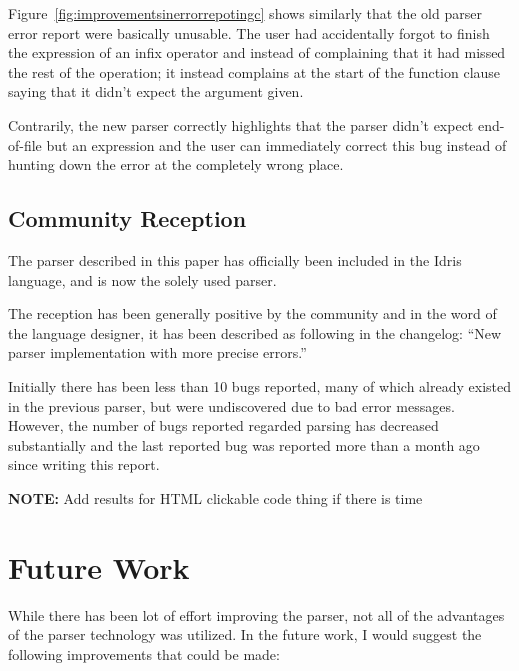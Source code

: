 \documentclass[a4paper]{article}%
\begin{document}
Figure~\ref{fig:improvementsinerrorrepotingc} shows similarly that the old parser error report were basically unusable. The user had accidentally
forgot to finish the expression of an infix operator and instead of complaining that it had missed the rest of the operation; it instead complains at the start of the function
clause saying that it didn't expect the argument given.

Contrarily, the new parser correctly highlights that the parser didn't expect end-of-file but an expression and the user can immediately correct this bug instead
of hunting down the error at the completely wrong place.

\subsection{Community Reception}
\label{sub:CommunityReception}
The parser described in this paper has officially been included in the Idris language, and is now the solely used parser.

The reception has been generally positive by the community and in the word of the language designer, it has been described as following in the changelog: ``New parser implementation with more precise errors.''

Initially there has been less than 10 bugs reported, many of which already existed in the previous parser, but were undiscovered due to bad error messages.
However, the number of bugs reported regarded parsing has decreased substantially and the last reported bug was reported more than a month ago since writing this report.

\textbf{NOTE:} Add results for HTML clickable code thing if there is time


\section{Future Work}
\label{sec:FutureWork}
While there has been lot of effort improving the parser, not all of the advantages of the parser technology was utilized.
In the future work, I would suggest the following improvements that could be made:
\end{document}
